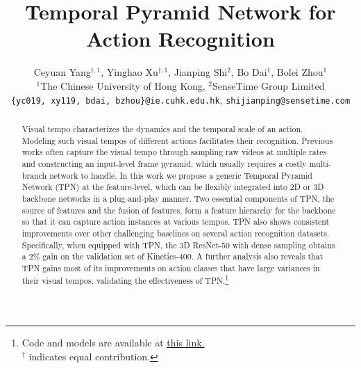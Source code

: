 \documentclass[10pt,twocolumn,letterpaper]{article}
\begin{document}
\title{Temporal Pyramid Network for Action Recognition}

\author{
  Ceyuan Yang$^{\dag,1}$, Yinghao Xu$^{\dag,1}$, Jianping Shi$^2$, Bo Dai$^1$, Bolei Zhou$^1$\\
  $^1$The Chinese University of Hong Kong, $^2$SenseTime Group Limited\\
  {\tt\small \{yc019, xy119, bdai, bzhou\}@ie.cuhk.edu.hk},
  {\tt\small shijianping@sensetime.com}\\
}

\maketitle


\begin{abstract}
   Visual tempo characterizes the dynamics and the temporal scale of an action. Modeling such visual tempos of different actions facilitates their recognition.
Previous works often capture the visual tempo through sampling raw videos at multiple rates and constructing an input-level frame pyramid, which usually requires a costly multi-branch network to handle. 
In this work we propose a generic Temporal Pyramid Network (TPN) at the feature-level, 
which can be flexibly integrated into 2D or 3D backbone networks in a plug-and-play manner. Two essential components of TPN, the source of features and the fusion of features, form a feature hierarchy for the backbone so that it can capture action instances at various tempos. TPN also shows consistent improvements over other challenging baselines on several action recognition datasets.
Specifically, when equipped with TPN, the 3D ResNet-50 with dense sampling obtains a
2\% gain on the validation set of Kinetics-400.
A further analysis also reveals that TPN gains most of its improvements on action classes that have large variances in their visual tempos, validating the effectiveness of TPN.\footnote{Code and models are available at \href{https://decisionforce.github.io/TPN/}{this link.} \\ \indent $^\dag$ indicates equal contribution.}
 \end{abstract}
\end{document}
